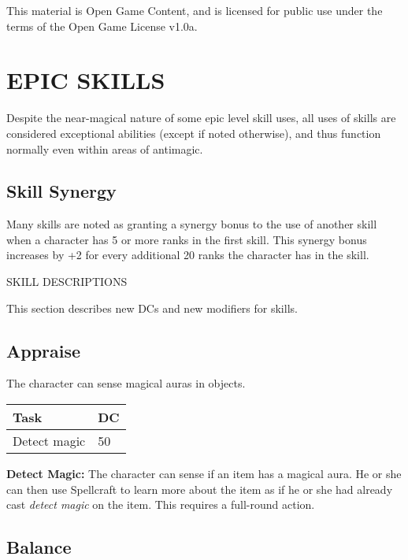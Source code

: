 \documentclass{article}
\begin{document}
This material is Open Game Content, and is licensed for public use under the terms 
of the Open Game License v1.0a.

\section*{{\LARGE{}EPIC SKILLS }}

\vspace{12pt}
Despite the near-magical nature of some epic level skill uses, all uses of skills 
are considered exceptional abilities (except if noted otherwise), and thus function 
normally even within areas of antimagic. 

\vspace{12pt}
\subsection*{\textbf{Skill Synergy }}

Many skills are noted as granting a synergy bonus to the use of another skill when 
a character has 5 or more ranks in the first skill. This synergy bonus increases 
by +2 for every additional 20 ranks the character has in the skill. 

\vspace{12pt}
SKILL DESCRIPTIONS 

This section describes new DCs and new modifiers for skills. 

\vspace{12pt}
\subsection*{Appraise }

The character can sense magical auras in objects. 

\begin{tabular}{|>{\raggedright}p{51pt}|>{\raggedright}p{13pt}|}
\hline
T\textbf{ask} & D\textbf{C }\tabularnewline
\hline
Detect magic & 50 \tabularnewline
\hline
\end{tabular}

\textbf{Detect Magic:}\textit{ }The character can sense if an item has a magical 
aura. He or she can then use Spellcraft to learn more about the item as if he or 
she had already cast \textit{detect magic }on the item. This requires a full-round 
action. 

\vspace{12pt}
\subsection*{Balance }
\end{document}
